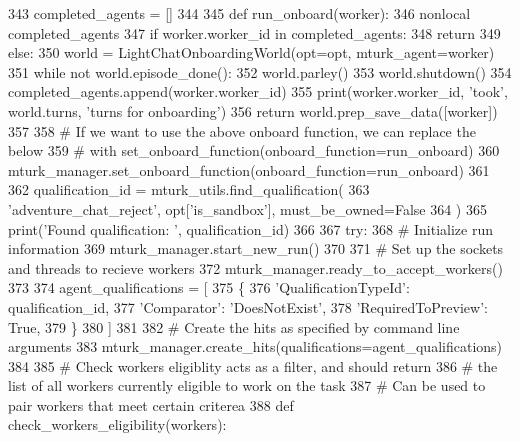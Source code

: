\begin{DoxyCode}
343     completed\_agents = []
344 
345     \textcolor{keyword}{def }run\_onboard(worker):
346         nonlocal completed\_agents
347         \textcolor{keywordflow}{if} worker.worker\_id \textcolor{keywordflow}{in} completed\_agents:
348             \textcolor{keywordflow}{return}
349         \textcolor{keywordflow}{else}:
350             world = LightChatOnboardingWorld(opt=opt, mturk\_agent=worker)
351             \textcolor{keywordflow}{while} \textcolor{keywordflow}{not} world.episode\_done():
352                 world.parley()
353             world.shutdown()
354             completed\_agents.append(worker.worker\_id)
355             print(worker.worker\_id, \textcolor{stringliteral}{'took'}, world.turns, \textcolor{stringliteral}{'turns for onboarding'})
356             \textcolor{keywordflow}{return} world.prep\_save\_data([worker])
357 
358     \textcolor{comment}{# If we want to use the above onboard function, we can replace the below}
359     \textcolor{comment}{# with set\_onboard\_function(onboard\_function=run\_onboard)}
360     mturk\_manager.set\_onboard\_function(onboard\_function=run\_onboard)
361 
362     qualification\_id = mturk\_utils.find\_qualification(
363         \textcolor{stringliteral}{'adventure\_chat\_reject'}, opt[\textcolor{stringliteral}{'is\_sandbox'}], must\_be\_owned=\textcolor{keyword}{False}
364     )
365     print(\textcolor{stringliteral}{'Found qualification: '}, qualification\_id)
366 
367     \textcolor{keywordflow}{try}:
368         \textcolor{comment}{# Initialize run information}
369         mturk\_manager.start\_new\_run()
370 
371         \textcolor{comment}{# Set up the sockets and threads to recieve workers}
372         mturk\_manager.ready\_to\_accept\_workers()
373 
374         agent\_qualifications = [
375             \{
376                 \textcolor{stringliteral}{'QualificationTypeId'}: qualification\_id,
377                 \textcolor{stringliteral}{'Comparator'}: \textcolor{stringliteral}{'DoesNotExist'},
378                 \textcolor{stringliteral}{'RequiredToPreview'}: \textcolor{keyword}{True},
379             \}
380         ]
381 
382         \textcolor{comment}{# Create the hits as specified by command line arguments}
383         mturk\_manager.create\_hits(qualifications=agent\_qualifications)
384 
385         \textcolor{comment}{# Check workers eligiblity acts as a filter, and should return}
386         \textcolor{comment}{# the list of all workers currently eligible to work on the task}
387         \textcolor{comment}{# Can be used to pair workers that meet certain criterea}
388         \textcolor{keyword}{def }check\_workers\_eligibility(workers):

\end{DoxyCode}
